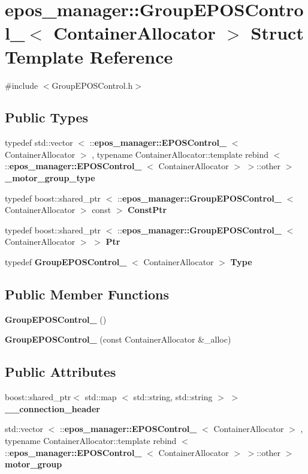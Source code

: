 \section{epos\-\_\-manager\-:\-:\-Group\-E\-P\-O\-S\-Control\-\_\-$<$ \-Container\-Allocator $>$ \-Struct \-Template \-Reference}
\label{structepos__manager_1_1GroupEPOSControl__}


{\ttfamily \#include $<$\-Group\-E\-P\-O\-S\-Control.\-h$>$}

\subsection*{\-Public \-Types}
\begin{DoxyCompactItemize}
\item 
typedef std\-::vector\*
$<$ \-::{\bf epos\-\_\-manager\-::\-E\-P\-O\-S\-Control\-\_\-}\*
$<$ \-Container\-Allocator $>$\*
, typename \*
\-Container\-Allocator\-::template \*
rebind\*
$<$ \-::{\bf epos\-\_\-manager\-::\-E\-P\-O\-S\-Control\-\_\-}\*
$<$ \-Container\-Allocator $>$\*
 $>$\-::other $>$ {\bf \-\_\-motor\-\_\-group\-\_\-type}
\item 
typedef boost\-::shared\-\_\-ptr\*
$<$ \-::{\bf epos\-\_\-manager\-::\-Group\-E\-P\-O\-S\-Control\-\_\-}\*
$<$ \-Container\-Allocator $>$ const  $>$ {\bf \-Const\-Ptr}
\item 
typedef boost\-::shared\-\_\-ptr\*
$<$ \-::{\bf epos\-\_\-manager\-::\-Group\-E\-P\-O\-S\-Control\-\_\-}\*
$<$ \-Container\-Allocator $>$ $>$ {\bf \-Ptr}
\item 
typedef {\bf \-Group\-E\-P\-O\-S\-Control\-\_\-}\*
$<$ \-Container\-Allocator $>$ {\bf \-Type}
\end{DoxyCompactItemize}
\subsection*{\-Public \-Member \-Functions}
\begin{DoxyCompactItemize}
\item 
{\bf \-Group\-E\-P\-O\-S\-Control\-\_\-} ()
\item 
{\bf \-Group\-E\-P\-O\-S\-Control\-\_\-} (const \-Container\-Allocator \&\-\_\-alloc)
\end{DoxyCompactItemize}
\subsection*{\-Public \-Attributes}
\begin{DoxyCompactItemize}
\item 
boost\-::shared\-\_\-ptr$<$ std\-::map\*
$<$ std\-::string, std\-::string $>$ $>$ {\bf \-\_\-\-\_\-connection\-\_\-header}
\item 
std\-::vector\*
$<$ \-::{\bf epos\-\_\-manager\-::\-E\-P\-O\-S\-Control\-\_\-}\*
$<$ \-Container\-Allocator $>$\*
, typename \*
\-Container\-Allocator\-::template \*
rebind\*
$<$ \-::{\bf epos\-\_\-manager\-::\-E\-P\-O\-S\-Control\-\_\-}\*
$<$ \-Container\-Allocator $>$\*
 $>$\-::other $>$ {\bf motor\-\_\-group}
\end{DoxyCompactItemize}


